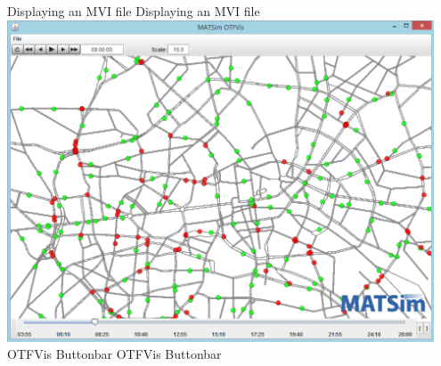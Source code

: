 \createfigure%
{Displaying an MVI file}%
{Displaying an MVI file}%
{\label{fig:OTFVisRunning}}%
{\includegraphics[width=0.95\textwidth, angle=0]{extending/figures/otfvis/image06.png}}%
{}
\createtable%
{OTFVis Buttonbar}%
{OTFVis Buttonbar}%
{\label{tab:otfvis-buttonbar}}%
